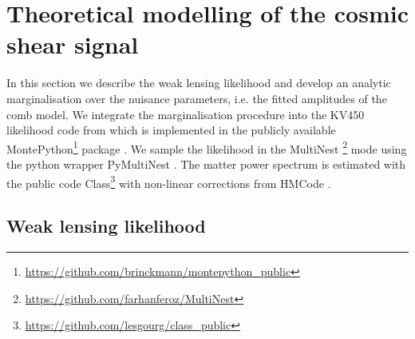\documentclass{aa}
\begin{document}
\section{Theoretical modelling of the cosmic shear signal}
\label{sec:likelihood}
In this section we describe the weak lensing likelihood and develop an analytic marginalisation over the nuisance parameters, i.e. the fitted amplitudes of the comb model.
We integrate the marginalisation procedure into the KV450 likelihood code from \cite{hildebrandt18} which is implemented in the publicly available {\sc MontePython}\footnote{\url{https://github.com/brinckmann/montepython_public}} package \citep{Audren:2012wb, Brinckmann:2018cvx}. We sample the likelihood in the {\sc MultiNest} \footnote{\url{https://github.com/farhanferoz/MultiNest}} mode \citep{feroz09,feroz19} using the python wrapper {\sc PyMultiNest} \citep{buchner14}. The matter power spectrum is estimated with the public code {\sc Class}\footnote{\url{https://github.com/lesgourg/class_public}}\citep{blas11} with non-linear corrections from {\sc HMCode} \citep{mead15}.
\subsection{Weak lensing likelihood}
\end{document}
